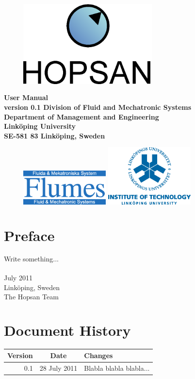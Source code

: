 

\pagestyle{empty}
\sffamily
\begin{figure}[H]
	\centering
   \includegraphics[width=70mm]{media/hopsan_logotype.eps}
	\label{fig:hopsan_logotype}
\end{figure}
\vfill
\begin{center}
\Huge\bfseries User Manual\\
\vfill
\Large version 0.1
\vfill\vfill\vfill
\Large\bfseries\rmfamily
Division of Fluid and Mechatronic Systems\\
Department of Management and Engineering \\
Link\"{o}ping University\\
SE-581 83 Link\"{o}ping, Sweden
\end{center}
\vfill
\begin{figure}[H]
  \centering
  \includegraphics[width=45mm]{media/flumes_logotype.eps}%
  \hspace{1.3in}%
  \includegraphics[width=45mm]{media/lith_logotype.eps}
\end{figure}
\vfill
\clearpage

\section*{Preface}
Write something...\\ \\
\noindent
July 2011\\
Link\"{o}ping, Sweden\\
The Hopsan Team

\section*{Document History}
\begin{tabular}{|r|c|l|}
	\hline
	\textbf{Version} & \textbf{Date} & \textbf{Changes} \\
	\hline
	0.1 & 28 July 2011 & Blabla blabla blabla... \\
	\hline
\end{tabular}

\clearpage


\pagestyle{plain}
\tableofcontents
\clearpage